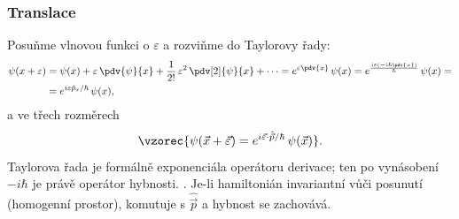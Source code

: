 \subsubsection{Translace}
Posuňme vlnovou funkci o \(\varepsilon\) a rozviňme do Taylorovy řady:
\begin{align*}
  \psi(x+\varepsilon) &= \psi(x) + \varepsilon\,\pdv{\psi}{x}
     + \frac{1}{2!}\,\varepsilon^2\,\pdv[2]{\psi}{x} + \dots
   = e^{\varepsilon\pdv{x}}\,\psi(x)
   = e^{\frac{i\varepsilon\left(-i\hbar\pdv{x}\right)}{\hbar}}\,\psi(x) = \\
  &= e^{i\varepsilon\hat p_x/\hbar}\,\psi(x),
\end{align*}
a ve třech rozměrech
\[
  \vzorec{\psi(\vec x + \vec\varepsilon) = e^{i\vec\varepsilon\cdot\hat{\vec p}/\hbar}\,\psi(\vec x)} .
\]
Taylorova řada je formálně exponenciála operátoru derivace; ten po
vynásobení \(-i\hbar\) je právě operátor hybnosti. . Je-li hamiltonián invariantní vůči posunutí (homogenní prostor),
komutuje s \(\hat{\vec p}\) a hybnost se zachovává.

